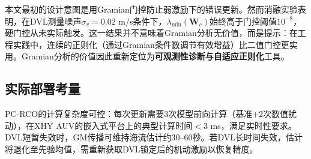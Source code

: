 本文最初的设计意图是用Gramian门控防止弱激励下的错误更新。然而消融实验表明，在DVL测量噪声$\sigma_v=0.02$ m/s条件下，$\lambda_{\min}(\bm{W}_c)$始终高于门控阈值$10^{-8}$，硬门控从未实际触发。这一结果并不意味着Gramian分析无价值，而是提示：在工程实践中，连续的正则化（通过Gramian条件数调节有效增益）比二值门控更实用。Gramian分析的价值因此重新定位为\textbf{可观测性诊断与自适应正则化}工具。

\subsection{实际部署考量}

PC-RCO的计算复杂度可控：每次更新需要3次模型前向计算（基准+2次数值扰动），在XHY AUV的嵌入式平台上的典型计算时间$<3$ ms，满足实时性要求。DVL短暂失效时，GM传播可维持海流估计约30--60秒。若DVL长时间失效，估计将退化至先验均值，需重新获取DVL锁定后的机动激励以恢复精度。

